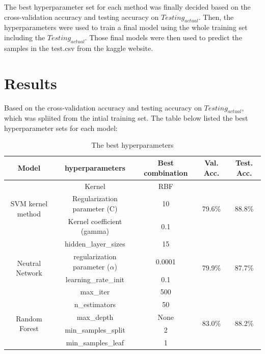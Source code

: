 The best hyperparameter set for each method was finally decided based on the cross-validation accuracy and testing accuracy on $Testing_{actual}$. Then, the hyperparameters were used to train a final model using the whole training set including the $Testing_{actual}$. Those final models were then used to predict the samples in the test.csv from the kaggle website.

\section*{\textbf{Results}} 

Based on the cross-validation accuracy and testing accuracy on $Testing_{actual}$, which was spliited from the intial training set. The table below listed the best hyperparameter sets for each model:

\begin{table}[H]
    \centering
    \begin{tabular}{|c|c|c|c|c|}
        \hline 
        Model       & hyperparameters & Best combination  & Val. Acc. & Test. Acc. \\
        \hline
        \multirow{3}{*}{SVM kernel method}   &  Kernel & RBF   & \multirow{3}{*}{79.6\%} & \multirow{3}{*}{88.8\%} \\
                        &  Regularization parameter (C)  &  10   &   & \\
                        &  Kernel coefficient (gamma)  &  0.1    &   & \\ 
        \hline
        \multirow{4}{*}{Neutral Network} & hidden\_layer\_sizes  & 15 & \multirow{4}{*}{79.9\%} & \multirow{4}{*}{87.7\%}\\
                        & regularization parameter ($\alpha$)   & 0.0001 &  & \\
                        & learning\_rate\_init & 0.1 & & \\
                        & max\_iter & 500  & & \\
        \hline
        \multirow{4}{*}{Random Forest}   &  n\_estimators & 50  & \multirow{4}{*}{83.0\%} & \multirow{4}{*}{88.2\%}\\
                        &  max\_depth  & None      &   & \\
                        &  min\_samples\_split  & 2     &  & \\
                        & min\_samples\_leaf & 1  & & \\
        \hline
    \end{tabular}
    \caption{The best hyperparameters}
    \label{the hyperparameter tuning}
\end{table}

